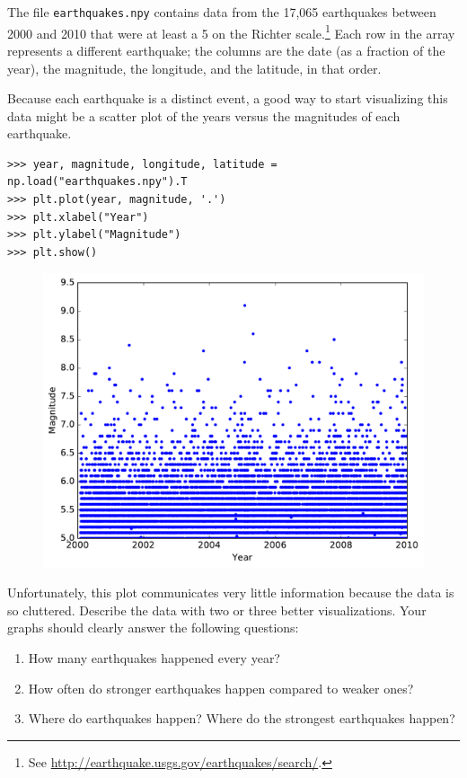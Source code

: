 \begin{problem} %
The file \texttt{earthquakes.npy} contains data from the 17,065 earthquakes between 2000 and 2010 that were at least a 5 on the Richter scale.\footnote{See \url{http://earthquake.usgs.gov/earthquakes/search/}.}
Each row in the array represents a different earthquake;
the columns are the date (as a fraction of the year), the magnitude, the longitude, and the latitude, in that order.

Because each earthquake is a distinct event, a good way to start visualizing this data might be a scatter plot of the years versus the magnitudes of each earthquake.

\begin{lstlisting}
>>> year, magnitude, longitude, latitude = np.load("earthquakes.npy").T
>>> plt.plot(year, magnitude, '.')
>>> plt.xlabel("Year")
>>> plt.ylabel("Magnitude")
>>> plt.show()
\end{lstlisting}

\begin{figure}[H] %
    \centering
    \includegraphics[width=.7\textwidth]{figures/earthquake_bad.pdf}
\end{figure}

Unfortunately, this plot communicates very little information because the data is so cluttered.
Describe the data with two or three better visualizations.
Your graphs should clearly answer the following questions:
\begin{enumerate}
    \item How many earthquakes happened every year?
    \item How often do stronger earthquakes happen compared to weaker ones?
    \item Where do earthquakes happen? Where do the strongest earthquakes happen?
\end{enumerate}
\end{problem}

